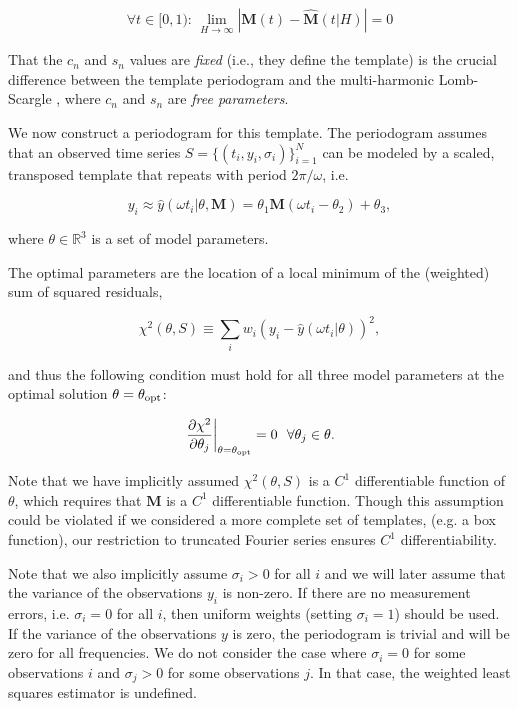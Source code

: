 \documentclass[apj]{emulateapj}
\begin{document}
\begin{equation}
\begin{split}
   \forall t \in [0, 1):\, \lim_{H\rightarrow\infty} \left|\mathbf{M}(t) - \hat{\mathbf{M}}(t|H)\right| = 0
\end{split}
\end{equation}

That the $c_n$ and $s_n$ values are \emph{fixed} (i.e., they define 
the template) is the crucial difference between the template periodogram and
the multi-harmonic Lomb-Scargle \citep{Palmer_2009,Bretthorst_1988}, where $c_n$ and $s_n$ 
are \emph{free parameters}.

We now construct a periodogram for this template. The periodogram assumes 
that an observed time series $S = \{(t_i, y_i, \sigma_i)\}_{i=1}^N$ can be modeled 
by a scaled, transposed template that repeats with period $2\pi / \omega$, i.e.

\begin{equation}
y_i \approx \hat{y}(\omega t_i|\theta, \mathbf{M}) = \theta_1\mathbf{M}(\omega t_i - \theta_2) + \theta_3,
\end{equation}

\noindent where $\theta\in \mathbb{R}^3$ is a set of model parameters. 

The optimal parameters are the location of a local minimum of the (weighted) sum of 
squared residuals,

\begin{equation}
    \chi^2(\theta, S) \equiv \sum_i w_i (y_i - \hat{y}(\omega t_i|\theta) )^2,
\end{equation}

\noindent and thus the following condition must hold for all three model parameters at 
the optimal solution $\theta=\theta_{\rm opt}$:

\begin{equation}\label{eq:chi2conds}
    \left.\frac{\partial\chi^2}{\partial\theta_j}\right|_{\theta=\theta_{\rm opt}} = 0~~\forall\theta_j\in\theta.
\end{equation}

Note that we have implicitly assumed $\chi^2(\theta,S)$ is a $C^1$ differentiable 
function of $\theta$, which requires that $\mathbf{M}$ is a
$C^1$ differentiable function. Though this assumption could be violated if we 
considered a more complete set of templates, (e.g. a box function), our restriction 
to truncated Fourier series ensures $C^1$ differentiability.

Note that we also implicitly assume $\sigma_i > 0$ for all $i$ and we will later
assume that the variance of the observations $y_i$ is non-zero. If there are no
measurement errors, i.e. $\sigma_i = 0$ for all $i$, then uniform weights
(setting $\sigma_i = 1$) should be used. If the variance of the observations $y$ 
is zero, the periodogram is trivial and will be zero for all frequencies. We do not
consider the case where $\sigma_i = 0$ for some observations $i$ and $\sigma_j > 0$ for
some observations $j$. In that case, the weighted least squares estimator is undefined.
\end{document}
